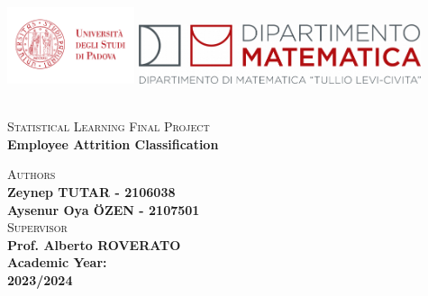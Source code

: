 \documentclass[
  10pt,
  paper=a4,
  ,captions=tableheading
]{scrartcl}
\begin{document}
\begin{titlepage}
\begin{center}
{
  \vspace{-2cm}
  \includegraphics[height=2.25cm]{img/logo-unipd.pdf}
  \hfill
  \includegraphics[height=1.75cm]{img/logo-long-mat.png}
  \par
  \vspace{0.5cm}
  \mbox{}\\[2.0cm]
  \null {}
  \Large\textsc{Statistical Learning Final Project} \\

  \vspace{3ex}
  \Huge\textbf{\color{UniPDColor}Employee Attrition Classification} \\

  \normalsize
  \textsc{Authors} \\
  \Large{\textbf{Zeynep TUTAR - 2106038 \\
      Aysenur Oya ÖZEN - 2107501}} \\
   \null
  \normalsize
  \textsc{Supervisor} \\
  \Large{\textbf{Prof. Alberto ROVERATO}} \\
  
   \null
  \Large{\textbf{Academic Year: \\2023/2024}}
}


\end{center}
\end{titlepage}
\restoregeometry
{}


\end{document}
